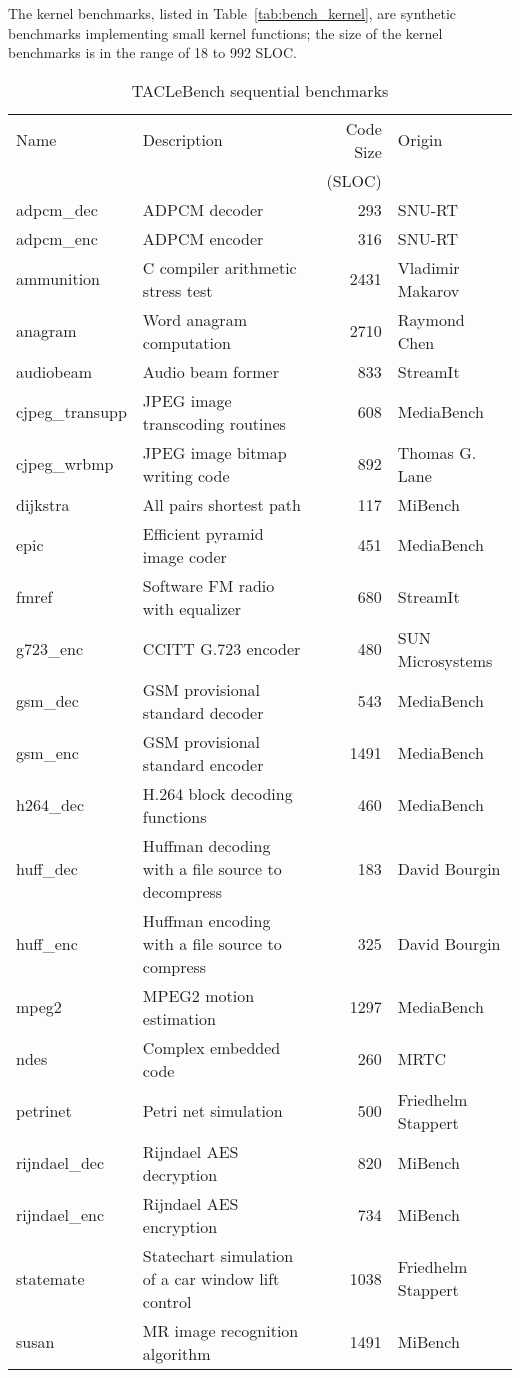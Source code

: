 \documentclass[a4paper,UKenglish]{oasics-v2016}
\begin{document}
The kernel benchmarks, listed in Table~\ref{tab:bench_kernel}, are synthetic benchmarks implementing small kernel functions; the size of the kernel benchmarks is in the range of 18 to 992 SLOC.
%
\begin{table}[t]
\centering
\caption{\label{tab:bench_sequential}TACLeBench sequential benchmarks}
\begin{tabular}{lL{5.5cm}rR{2.5cm}}
\toprule
Name & Description & Code Size & Origin\\
   & &  (SLOC) & \\ \midrule
adpcm\_dec & ADPCM decoder & 293 & SNU-RT \\
adpcm\_enc &  ADPCM encoder  & 316  & SNU-RT \\
ammunition & C compiler arithmetic stress test  & 2431 & Vladimir Makarov \\
anagram &  Word anagram computation & 2710  & Raymond Chen \\
audiobeam &  Audio beam former  & 833  & StreamIt \\
cjpeg\_transupp &  JPEG image transcoding routines  & 608 & MediaBench \\
cjpeg\_wrbmp & JPEG image bitmap writing code & 892 & Thomas G. Lane \\
dijkstra & All pairs shortest path  & 117  & MiBench \\
epic & Efficient pyramid image coder  & 451  & MediaBench \\
fmref &  Software FM radio with equalizer & 680  & StreamIt \\
g723\_enc &  CCITT G.723 encoder  & 480  & SUN Microsystems \\
gsm\_dec & GSM provisional standard decoder & 543 & MediaBench \\
gsm\_enc & GSM provisional standard encoder & 1491 & MediaBench \\
h264\_dec &  H.264 block decoding functions & 460 & MediaBench \\
huff\_dec &  Huffman decoding with a file source to decompress  & 183  & David Bourgin \\
huff\_enc & Huffman encoding with a file source to compress  & 325  & David Bourgin \\
mpeg2 &  MPEG2 motion estimation  & 1297 & MediaBench \\
ndes & Complex embedded code  & 260  & MRTC \\
petrinet & Petri net simulation & 500  & Friedhelm Stappert \\
rijndael\_dec & Rijndael AES decryption  & 820 & MiBench \\
rijndael\_enc & Rijndael AES encryption  & 734 & MiBench \\
statemate &  Statechart simulation of a car window lift control & 1038 & Friedhelm Stappert \\
susan &  MR image recognition algorithm & 1491 & MiBench \\
\bottomrule
\end{tabular}
\end{table}
\end{document}
